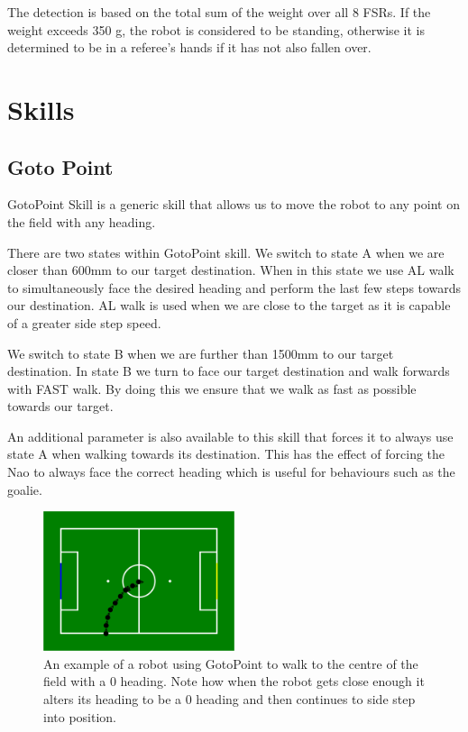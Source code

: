 \documentclass[pdftex,11pt,a4paper]{report}
\begin{document}
The detection is based on the total sum of the weight over all 8 FSRs. If
the weight exceeds 350 g, the robot is considered to be standing, otherwise
it is determined to be in a referee's hands if it has not also fallen over.
\section{Skills}

\subsection{Goto Point}
GotoPoint Skill is a generic skill that allows us to move the robot to any point on the field with any heading.

There are two states within GotoPoint skill. We switch to state A when we are closer than 600mm to our target destination. When in this state we use AL walk to simultaneously face the desired heading and perform the last few steps towards our destination. AL walk is used when we are close to the target as it is capable of a greater side step speed.

We switch to state B when we are further than 1500mm to our target destination. In state B we turn to face our target destination and walk forwards with FAST walk. By doing this we ensure that we walk as fast as possible towards our target. 

An additional parameter is also available to this skill that forces it to always use state A when walking towards its destination. This has the effect of forcing the Nao to always face the correct heading which is useful for behaviours such as the goalie.

\begin{figure}[ht]
\centering
\includegraphics[width=0.5\textwidth]{figures/gotoPoint}
\caption{An example of a robot using GotoPoint to walk to the centre of the field with a 0 heading. Note how when the robot gets close enough it alters its heading to be a 0 heading and then continues to side step into position.} \label{figGotoPoint}
\end{figure} 
\end{document}
